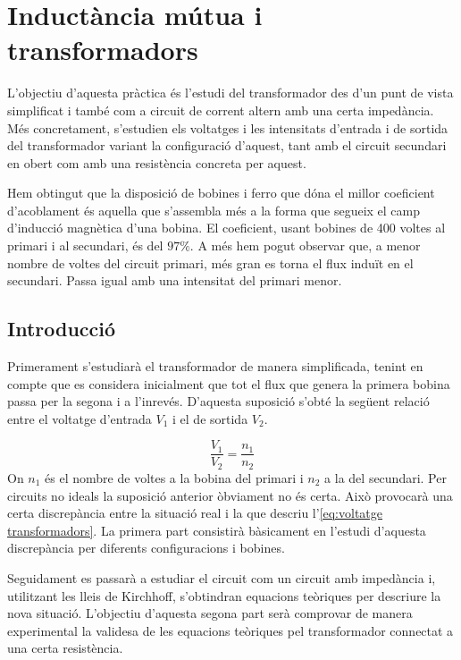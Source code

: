 \chapter{Inductància mútua i transformadors}

\begin{resum}
	L'objectiu d'aquesta pràctica és l'estudi del transformador des d'un punt de vista simplificat i també com a circuit de corrent altern amb una certa impedància. Més concretament, s'estudien els voltatges i les intensitats d'entrada i de sortida del transformador variant la configuració d'aquest, tant amb el circuit secundari en obert com amb una resistència concreta per aquest.
	
	Hem obtingut que la disposició de bobines i ferro que dóna el millor coeficient d'acoblament és aquella que s'assembla més a la forma que segueix el camp d'inducció magnètica d'una bobina. El coeficient, usant bobines de 400 voltes al primari i al secundari, és del $97\%$. A més hem pogut observar que, a menor nombre de voltes del circuit primari, més gran es torna el flux induït en el secundari. Passa igual amb una intensitat del primari menor.
\end{resum}

\section{Introducció}\label{sec:introducció}

Primerament s'estudiarà el transformador de manera simplificada, tenint en compte que es considera inicialment que tot el flux que genera la primera bobina passa per la segona i a l'inrevés. D'aquesta suposició s'obté la següent relació entre el voltatge d'entrada $V_1$ i el de sortida $V_2$. 

\begin{equation}\label{eq:voltatge transformadors}
  \frac{V_1}{V_2}=\frac{n_1}{n_2}
\end{equation}
On $n_1$ és el nombre de voltes a la bobina del primari i $n_2$ a la del secundari. Per circuits no ideals la suposició anterior òbviament no és certa. Això provocarà una certa discrepància entre la situació real i la que descriu l'\cref{eq:voltatge transformadors}. La primera part consistirà bàsicament en l'estudi d'aquesta discrepància per diferents configuracions i bobines.

Seguidament es passarà a estudiar el circuit com un circuit amb impedància i, utilitzant les lleis de Kirchhoff, s'obtindran equacions teòriques per descriure la nova situació. L'objectiu d'aquesta segona part serà comprovar de manera experimental la validesa de les equacions teòriques pel transformador connectat a una certa resistència.

